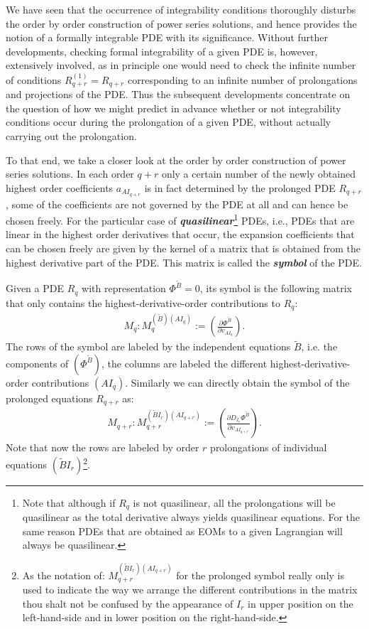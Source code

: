 We have seen that the occurrence of integrability conditions thoroughly disturbs the order by order construction of power series solutions, and hence provides the notion of a formally integrable PDE with its significance. Without further developments, checking formal integrability of a given PDE is, however, extensively involved, as in principle one would need to check the infinite number of conditions $R_{q+r}^{(1)} = R_{q+r}$ corresponding to an infinite number of prolongations and projections of the PDE. Thus the subsequent developments concentrate on the question of how we might predict in advance whether or not integrability conditions occur during the prolongation of a given PDE, without actually carrying out the prolongation.

To that end, we take a closer look at the order by order construction of power series solutions.
In each order $q+r$ only a certain number of the newly obtained highest order coefficients $a_{AI_{q+r}}$ is in fact determined by the prolonged PDE $R_{q+r}$, some of the coefficients are not governed by the PDE at all and can hence be chosen freely.
For the particular case of \textit{\textbf{quasilinear}}\footnote{Note that although if $R_q$ is not quasilinear, all the prolongations will be quasilinear as the total derivative always yields quasilinear equations. For the same reason PDEs that are obtained as EOMs to a given Lagrangian will always be quasilinear.} PDEs, i.e., PDEs that are linear in the highest order derivatives that occur, the expansion coefficients that can be chosen freely are given by the kernel of a matrix that is obtained from the highest derivative part of the PDE. This matrix is called the \textit{\textbf{symbol}} of the PDE.
\begin{definition}[symbol]
Given a PDE $R_q$ with representation $\Phi^{\tilde{B}}=0$, its symbol is the following matrix that only contains the highest-derivative-order contributions to $R_q$:
\begin{align}
    M_q : M_q^{(\tilde{B})({AI_q})} := \left ( \frac{\partial \Phi^{\tilde{B}}}{\partial v_{AI_q}} \right ).
\end{align}
The rows of the symbol are labeled by the independent equations $\tilde{B}$, i.e. the components of $(\Phi^{\tilde{B}})$, the columns are labeled the different highest-derivative-order contributions $(AI_q)$.
Similarly we can directly obtain the symbol of the prolonged equations $R_{q+r}$ as:
\begin{align}\label{proSym}
    M_{q+r} : M_{q+r} ^{(\tilde{B}I_r) (AI_{q+r})}:= \left ( \frac{\partial D_{I_r}\Phi^{\tilde{B}
    }}{\partial v_{AI_{q+r}}} \right ). 
\end{align}
Note that now the rows are labeled by order $r$ prolongations of individual equations $(\tilde{B}I_r)$\footnote{As the notation of: $M_{q+r} ^{(\tilde{B}I_r) (AI_{q+r})}$ for the prolonged symbol really only is used to indicate the way we arrange the different contributions in the matrix thou shalt not be confused by the appearance of $I_r$ in upper position on the left-hand-side and in lower position on the right-hand-side.}.
\end{definition}
